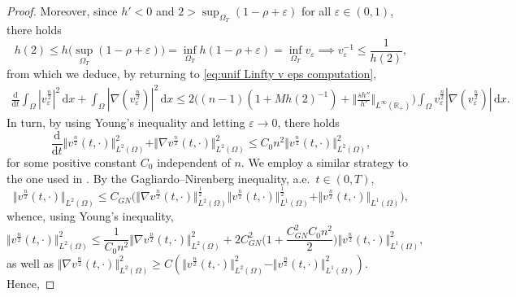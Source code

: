 \documentclass[11pt,a4paper,reqno]{amsart}
\theoremstyle{remark}
\theoremstyle{definition}
\numberwithin{equation}{section}
\renewcommand{\d}{\, \mathrm{d} }
\newcommand{\der}{\mathrm{d}}
\begin{document}
\begin{proof}
    Moreover, since $h' < 0$ and $2 > \sup_{\Omega_T} (1-\rho+\varepsilon)$ for all $\varepsilon \in (0,1)$, there holds 
    \begin{equation*}
      h(2) \leq h\big(\sup_{\Omega_T} (1-\rho+\varepsilon)\big) = \inf_{\Omega_T}h(1-\rho+\varepsilon) = \inf_{\Omega_T} v_\varepsilon \implies v_\varepsilon^{-1} \leq \frac{1}{h(2)}, 
    \end{equation*}
    from which we deduce, by returning to \eqref{eq:unif Linfty v eps computation}, 
     \begin{equation*}
       \begin{aligned} \frac{\der}{\der t}\! \int_\Omega \! |v_\varepsilon^{\frac{n}{2}}|^2 \d x \!+\! \int_\Omega \!|\nabla (v_\varepsilon^{\frac{n}{2}}) |^2 \d x \!\leq\! 2\Big( (n\!-\!1)(1\!+\!Mh(2)^{-1}) \!+\! \Vert \frac{s h''}{h'} \Vert_{L^\infty(\mathbb{R}_+)} \Big) \!\int_\Omega \!v_\varepsilon^{\frac{n}{2}} |\nabla(v_\varepsilon^{\frac{n}{2}})| \d x. 
       \end{aligned}
    \end{equation*}
    In turn, by using Young's inequality and letting $\varepsilon \to 0$, there holds 
  \begin{equation*}
        \frac{\der}{\der t}\Vert v^{\frac{n}{2}}(t,\cdot)\Vert_{L^2(\Omega)}^2 + \Vert \nabla v^{\frac{n}{2}} (t,\cdot) \Vert_{L^2(\Omega)}^2 \leq C_0 n^2 \Vert v^{\frac{n}{2}}(t,\cdot) \Vert_{L^2(\Omega)}^2, 
    \end{equation*}
    for some positive constant $C_0$ independent of $n$. We employ a similar strategy to the one used in \cite[Proof of Theorem 1.7]{reg1}. By the Gagliardo--Nirenberg inequality, a.e.~$t \in (0,T)$, 
    \begin{equation*}
      \Vert v^{\frac{n}{2}}(t,\cdot) \Vert_{L^2(\Omega)} \leq C_{GN}\Big(  \Vert \nabla v^{\frac{n}{2}}(t,\cdot) \Vert_{L^2(\Omega)}^{\frac{1}{2}} \Vert v^{\frac{n}{2}}(t,\cdot) \Vert_{L^1(\Omega)}^{\frac{1}{2}} +  \Vert v^{\frac{n}{2}}(t,\cdot) \Vert_{L^1(\Omega)} \Big), 
    \end{equation*}
whence, using Young's inequality, 
\begin{equation*}
      \Vert v^{\frac{n}{2}}(t,\cdot) \Vert_{L^2(\Omega)}^2 \leq \frac{1}{C_0 n^2} \Vert \nabla v^{\frac{n}{2}}(t,\cdot) \Vert_{L^2(\Omega)}^{2}  + 2C_{GN}^2\Big(1+\frac{C^2_{GN} C_0 n^2}{2}\Big) \Vert v^{\frac{n}{2}}(t,\cdot) \Vert_{L^1(\Omega)}^2, 
    \end{equation*}
    as well as $\Vert \nabla v^{\frac{n}{2}}(t,\cdot) \Vert_{L^2(\Omega)}^{2} \geq C ( \Vert v^{\frac{n}{2}}(t,\cdot) \Vert_{L^2(\Omega)}^2 - \Vert v^{\frac{n}{2}}(t,\cdot) \Vert_{L^1(\Omega)}^2  )$. Hence, 

\end{proof}
\end{document}
